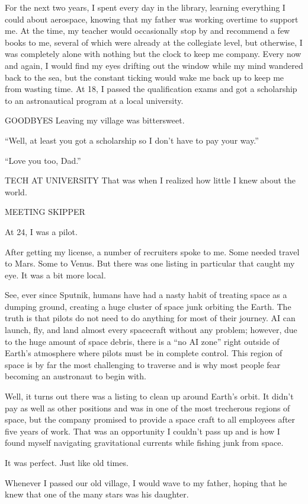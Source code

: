 For the next two years, I spent every day in the library, learning everything I could about aerospace, knowing that my father was working overtime to support me.
At the time, my teacher would occasionally stop by and recommend a few books to me, several of which were already at the collegiate level, but otherwise, I was completely alone with nothing but the clock to keep me company.
Every now and again, I would find my eyes drifting out the window while my mind wandered back to the sea, but the constant ticking would wake me back up to keep me from wasting time.
At 18, I passed the qualification exams and got a scholarship to an astronautical program at a local university.

GOODBYES
Leaving my village was bittersweet.

``Well, at least you got a scholarship so I don't have to pay your way.''

``Love you too, Dad.''

TECH AT UNIVERSITY
That was when I realized how little I knew about the world.

MEETING SKIPPER

At 24, I was a pilot.

After getting my license, a number of recruiters spoke to me.
Some needed travel to Mars. Some to Venus.
But there was one listing in particular that caught my eye.
It was a bit more local.

See, ever since Sputnik, humans have had a nasty habit of treating space as a dumping ground, creating a huge cluster of space junk orbiting the Earth.
The truth is that pilots do not need to do anything for most of their journey.
AI can launch, fly, and land almost every spacecraft without any problem; however, due to the huge amount of space debris, there is a ``no AI zone'' right outside of Earth's atmosphere where pilots must be in complete control.
This region of space is by far the most challenging to traverse and is why most people fear becoming an austronaut to begin with.

Well, it turns out there was a listing to clean up around Earth's orbit.
It didn't pay as well as other positions and was in one of the most trecherous regions of space, but the company promised to provide a space craft to all employees after five years of work.
That was an opportunity I couldn't pass up and is how I found myself navigating gravitational currents while fishing junk from space.

It was perfect.
Just like old times.

Whenever I passed our old village, I would wave to my father, hoping that he knew that one of the many stars was his daughter.
